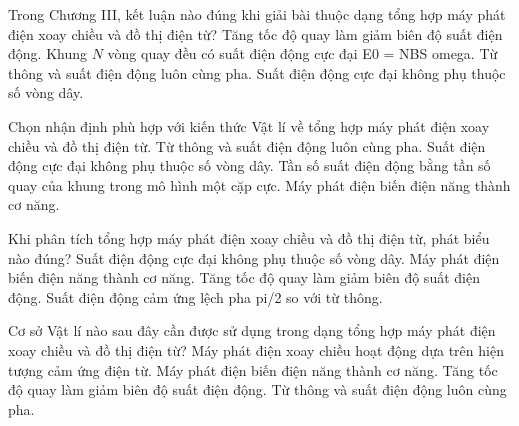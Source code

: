 \begin{ex}
Trong Chương III, kết luận nào đúng khi giải bài thuộc dạng tổng hợp máy phát điện xoay chiều và đồ thị điện từ?
\choice
{Tăng tốc độ quay làm giảm biên độ suất điện động.}
{\True Khung $N$ vòng quay đều có suất điện động cực đại E0 = NBS omega.}
{Từ thông và suất điện động luôn cùng pha.}
{Suất điện động cực đại không phụ thuộc số vòng dây.}
\end{ex}

\begin{ex}
Chọn nhận định phù hợp với kiến thức Vật lí về tổng hợp máy phát điện xoay chiều và đồ thị điện từ.
\choice
{Từ thông và suất điện động luôn cùng pha.}
{Suất điện động cực đại không phụ thuộc số vòng dây.}
{\True Tần số suất điện động bằng tần số quay của khung trong mô hình một cặp cực.}
{Máy phát điện biến điện năng thành cơ năng.}
\end{ex}

\begin{ex}
Khi phân tích tổng hợp máy phát điện xoay chiều và đồ thị điện từ, phát biểu nào đúng?
\choice
{Suất điện động cực đại không phụ thuộc số vòng dây.}
{Máy phát điện biến điện năng thành cơ năng.}
{Tăng tốc độ quay làm giảm biên độ suất điện động.}
{\True Suất điện động cảm ứng lệch pha pi/2 so với từ thông.}
\end{ex}

\begin{ex}
Cơ sở Vật lí nào sau đây cần được sử dụng trong dạng tổng hợp máy phát điện xoay chiều và đồ thị điện từ?
\choice
{\True Máy phát điện xoay chiều hoạt động dựa trên hiện tượng cảm ứng điện từ.}
{Máy phát điện biến điện năng thành cơ năng.}
{Tăng tốc độ quay làm giảm biên độ suất điện động.}
{Từ thông và suất điện động luôn cùng pha.}
\end{ex}

